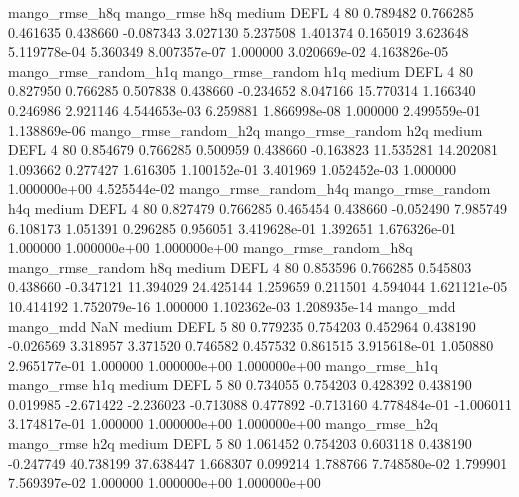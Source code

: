        mango_rmse_h8q        mango_rmse                  h8q     medium     DEFL                 4 80  0.789482       0.766285 0.461635       0.438660   -0.087343      3.027130      5.237508     1.401374       0.165019  3.623648 5.119778e-04     5.360349   8.007357e-07            1.000000    3.020669e-02        4.163826e-05
mango_rmse_random_h1q mango_rmse_random                  h1q     medium     DEFL                 4 80  0.827950       0.766285 0.507838       0.438660   -0.234652      8.047166     15.770314     1.166340       0.246986  2.921146 4.544653e-03     6.259881   1.866998e-08            1.000000    2.499559e-01        1.138869e-06
mango_rmse_random_h2q mango_rmse_random                  h2q     medium     DEFL                 4 80  0.854679       0.766285 0.500959       0.438660   -0.163823     11.535281     14.202081     1.093662       0.277427  1.616305 1.100152e-01     3.401969   1.052452e-03            1.000000    1.000000e+00        4.525544e-02
mango_rmse_random_h4q mango_rmse_random                  h4q     medium     DEFL                 4 80  0.827479       0.766285 0.465454       0.438660   -0.052490      7.985749      6.108173     1.051391       0.296285  0.956051 3.419628e-01     1.392651   1.676326e-01            1.000000    1.000000e+00        1.000000e+00
mango_rmse_random_h8q mango_rmse_random                  h8q     medium     DEFL                 4 80  0.853596       0.766285 0.545803       0.438660   -0.347121     11.394029     24.425144     1.259659       0.211501  4.594044 1.621121e-05    10.414192   1.752079e-16            1.000000    1.102362e-03        1.208935e-14
            mango_mdd         mango_mdd                  NaN     medium     DEFL                 5 80  0.779235       0.754203 0.452964       0.438190   -0.026569      3.318957      3.371520     0.746582       0.457532  0.861515 3.915618e-01     1.050880   2.965177e-01            1.000000    1.000000e+00        1.000000e+00
       mango_rmse_h1q        mango_rmse                  h1q     medium     DEFL                 5 80  0.734055       0.754203 0.428392       0.438190    0.019985     -2.671422     -2.236023    -0.713088       0.477892 -0.713160 4.778484e-01    -1.006011   3.174817e-01            1.000000    1.000000e+00        1.000000e+00
       mango_rmse_h2q        mango_rmse                  h2q     medium     DEFL                 5 80  1.061452       0.754203 0.603118       0.438190   -0.247749     40.738199     37.638447     1.668307       0.099214  1.788766 7.748580e-02     1.799901   7.569397e-02            1.000000    1.000000e+00        1.000000e+00
